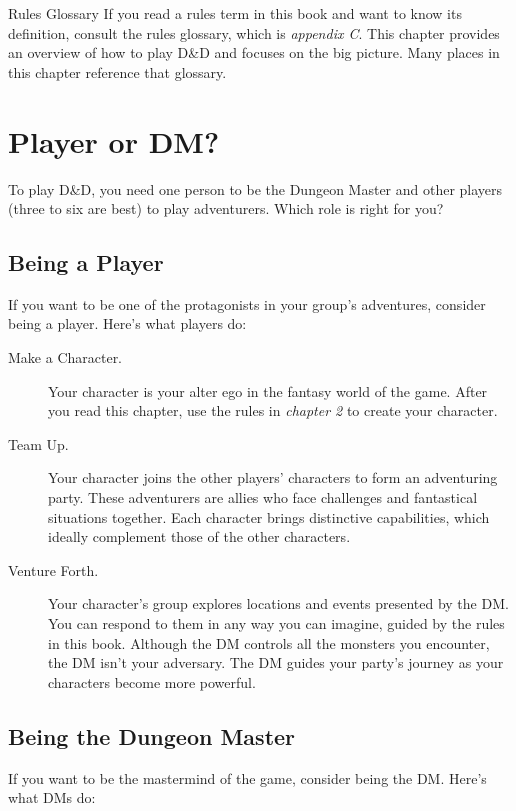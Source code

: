 \documentclass[10pt,a4paper,twoside,bg=print,twocolumn,openany,nodeprecatedcode]{dndbook}
\begin{document}
\begin{DndSidebar}[float=!b]{Rules Glossary}
If you read a rules term in this book and want to know its definition, consult the rules glossary, which is \textit{appendix C}. This chapter provides an overview of how to play D\&D and focuses on the big picture. Many places in this chapter reference that glossary.



\end{DndSidebar}

\section{Player or DM?}
To play D\&D, you need one person to be the Dungeon Master and other players (three to six are best) to play adventurers. Which role is right for you?

\subsection{Being a Player}
If you want to be one of the protagonists in your group's adventures, consider being a player. Here's what players do:


\begin{description}
\item[Make a Character.]
Your character is your alter ego in the fantasy world of the game. After you read this chapter, use the rules in \textit{chapter 2} to create your character.
\item[Team Up.]
Your character joins the other players' characters to form an adventuring party. These adventurers are allies who face challenges and fantastical situations together. Each character brings distinctive capabilities, which ideally complement those of the other characters.
\item[Venture Forth.]
Your character's group explores locations and events presented by the DM. You can respond to them in any way you can imagine, guided by the rules in this book. Although the DM controls all the monsters you encounter, the DM isn't your adversary. The DM guides your party's journey as your characters become more powerful.
\end{description}

\subsection{Being the Dungeon Master}
If you want to be the mastermind of the game, consider being the DM. Here's what DMs do:
\end{document}
